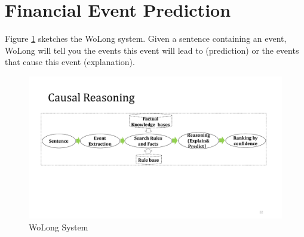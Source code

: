 \section{Financial Event Prediction}
Figure \ref{fig:causal_reasoning_architecture} sketches the WoLong system.
Given a sentence containing an event, WoLong will tell you the events this event will lead to (prediction) or the events that cause this event (explanation). 

\begin{figure}[htbp]
	\centering
	\includegraphics[width=0.95\columnwidth]{figures/causal_reasoning_architecture}
	\caption{WoLong System}
	\label{fig:causal_reasoning_architecture}
\end{figure}

